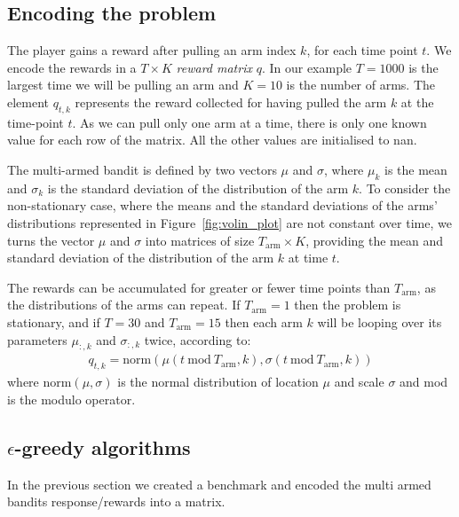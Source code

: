 \documentclass[]{scrartcl}
\theoremstyle{definition}
\begin{document}
\subsection*{Encoding the problem}
The player gains a reward after pulling an arm index $k$, for each time point $t$. We encode the rewards in a $T\times K$ \emph{reward matrix} $q$. In our example $T=1000$ is the largest time we will be pulling an arm and $K=10$ is the number of arms. The element $q_{t, k}$ represents the reward collected for having pulled the arm $k$ at the time-point $t$. As we can pull only one arm at a time, there is only one known value for each row of the matrix. All the other values are initialised to nan.

The multi-armed bandit is defined by two vectors $\mu$ and $\sigma$, where $\mu_k$ is the mean and $\sigma_k$ is the standard deviation of the distribution of the arm $k$.
To consider the non-stationary case, where the means and the standard deviations of the arms' distributions represented in Figure~\ref{fig:volin_plot} are not constant over time, we turns the vector $\mu$ and $\sigma$ into matrices of size $T_{\text{arm}} \times K$, providing the mean and standard deviation of the distribution of the arm $k$ at time $t$.

The rewards can be accumulated for greater or fewer time points than $T_{\text{arm}}$, as the distributions of the arms can repeat. If $T_{\text{arm}}=1$ then the problem is stationary, and if $T=30$ and $T_{\text{arm}}=15$ then each arm $k$ will be looping over its parameters $\mu_{:, k}$ and $\sigma_{:, k}$ twice, according to:
\begin{align*}
q_{t, k}
=
\text{norm}\left(\mu({t~\text{mod}~T_{\text{arm}}, k}), \sigma({t~\text{mod}~T_{\text{arm}}, k})\right)
\end{align*}
where $\text{norm}(\mu, \sigma)$ is the normal distribution of location $\mu$ and scale $\sigma$ and mod is the modulo operator.

\subsection*{$\epsilon$-greedy algorithms}

In the previous section we created a benchmark and encoded the multi armed bandits response/rewards into a matrix.
\end{document}
